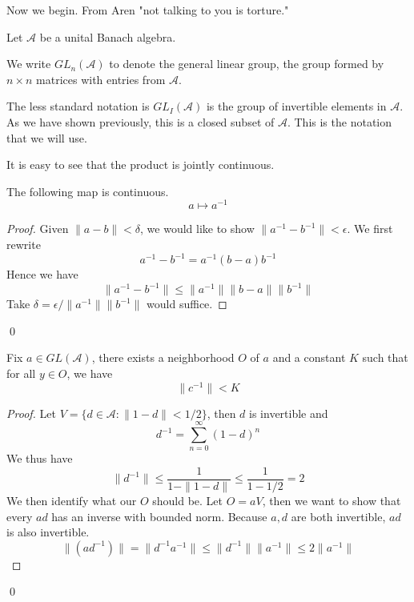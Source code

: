 Now we begin. From Aren "not talking to you is torture."

Let $\mathcal{A}$ be a unital Banach algebra.

We write $GL_n(\mathcal{A})$ to denote the general linear group, the group formed by $n\times n$ matrices with entries from $\mathcal{A}$. 

The less standard notation is $GL_I(\mathcal{A})$ is the group of invertible elements in $\mathcal{A}$. As we have shown previously, this is a closed subset of $\mathcal{A}$. This is the notation that we will use.

\begin{remark}
    It is easy to see that the product is jointly continuous.
\end{remark}

\begin{proposition}
    The following map is continuous.
    \begin{equation*}
        a\mapsto a^{-1}
    \end{equation*}
\end{proposition}
\begin{proof}
    Given $\|a-b\|<\delta$, we would like to show $\|a^{-1}-b^{-1}\|<\epsilon$. We first rewrite
    \begin{equation*}
        a^{-1}-b^{-1}=a^{-1}(b-a)b^{-1}
    \end{equation*}
    Hence we have
    \begin{equation*}
        \|a^{-1}-b^{-1}\|\leq\|a^{-1}\|\|b-a\|\|b^{-1}\|
    \end{equation*}
    Take $\delta=\epsilon/\|a^{-1}\|\|b^{-1}\|$ would suffice.
\end{proof}
\qed

\begin{proposition}
    Fix $a\in GL(\mathcal{A})$, there exists a neighborhood $O$ of $a$ and a constant $K$ such that for all $y\in O$, we have
    \begin{equation*}
        \|c^{-1}\|<K
    \end{equation*}
\end{proposition}
\begin{proof}
    Let $V=\{d\in\mathcal{A}: \|1-d\|<1/2\}$, then $d$ is invertible and
    \begin{equation*}
        d^{-1}=\sum_{n=0}^\infty(1-d)^n
    \end{equation*}
    We thus have
    \begin{equation*}
        \|d^{-1}\|\leq\frac{1}{1-\|1-d\|}\leq \frac{1}{1-1/2}=2
    \end{equation*}
    We then identify what our $O$ should be. Let $O=aV$, then we want to show that every $ad$ has an inverse with bounded norm. Because $a,d$ are both invertible, $ad$ is also invertible.
    \begin{equation*}
        \|(ad^{-1})\|=\|d^{-1}a^{-1}\|\leq \|d^{-1}\|\|a^{-1}\|\leq 2\|a^{-1}\|
    \end{equation*}
\end{proof}
\qed

